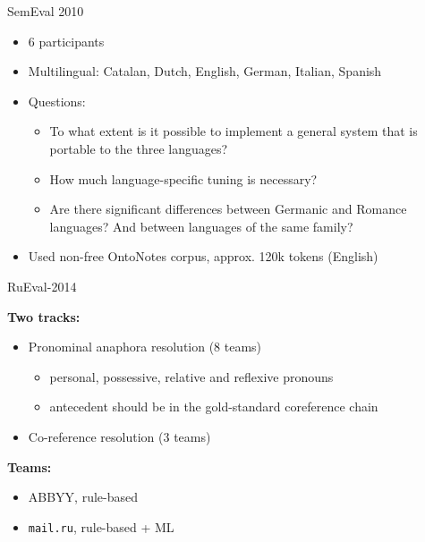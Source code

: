 \documentclass[dvipsnames, 10pt, compress]{beamer}
\begin{document}
\begin{frame}{SemEval 2010}


\begin{itemize}
  \item 6 participants
  \item Multilingual: Catalan, Dutch, English, German, Italian, Spanish
  \item Questions:
  \begin{itemize}
\item    To what extent is it possible to implement a general system that is portable to the three languages?
\item    How much language-specific tuning is necessary?
\item    Are there significant differences between Germanic and Romance languages? And between languages of the same family?
\end{itemize}
  \item Used non-free OntoNotes corpus, approx. 120k tokens (English)
\end{itemize}



\end{frame}

\begin{frame}{RuEval-2014}

\textbf{Two tracks:}
\begin{itemize}
  \item Pronominal anaphora resolution (8 teams)
  \begin{itemize}
     \item personal, possessive, relative and reflexive pronouns
     \item antecedent should be in the gold-standard coreference chain
  \end{itemize}
  \item Co-reference resolution (3 teams)
\end{itemize}

\textbf{Teams:}
\begin{itemize}
  \item ABBYY, rule-based
  \item \texttt{mail.ru}, rule-based + ML
\end{itemize}



\end{frame}
\end{document}
